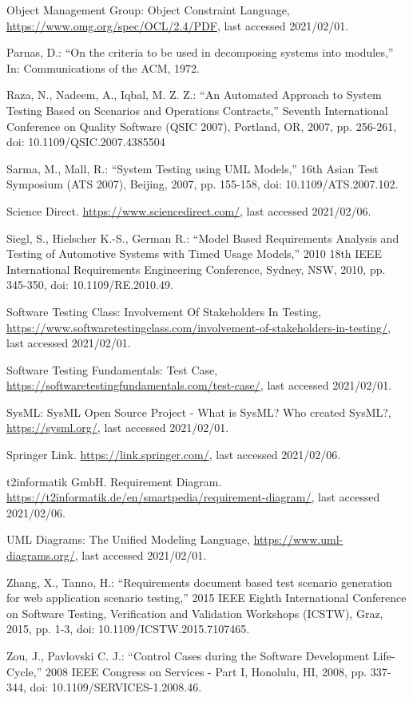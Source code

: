 \documentclass[a4paper,10pt, bibliography=totocnumbered]{scrreprt}
\begin{document}
\begin{thebibliography}{9}
 Object Management Group: Object Constraint Language, \url{https://www.omg.org/spec/OCL/2.4/PDF}, last accessed 2021/02/01.

 Parnas, D.: \enquote{On the criteria to be used in decomposing systems into modules,}
In: Communications of the ACM, 1972.

 Raza, N., Nadeem, A., Iqbal, M. Z. Z.: \enquote{An Automated Approach to System Testing Based on Scenarios and Operations Contracts,} Seventh International Conference on Quality Software (QSIC 2007), Portland, OR, 2007, pp. 256-261, doi: 10.1109/QSIC.2007.4385504

 Sarma, M., Mall, R.: \enquote{System Testing using UML Models,} 16th Asian Test Symposium (ATS 2007), Beijing, 2007, pp. 155-158, doi: 10.1109/ATS.2007.102.

 Science Direct. \url{https://www.sciencedirect.com/}, last accessed 2021/02/06.

 Siegl, S., Hielscher K.-S., German R.: \enquote{Model Based Requirements Analysis and Testing of Automotive Systems with Timed Usage Models,} 2010 18th IEEE International Requirements Engineering Conference, Sydney, NSW, 2010, pp. 345-350, doi: 10.1109/RE.2010.49.

 Software Testing Class: Involvement Of Stakeholders In Testing, \url{https://www.softwaretestingclass.com/involvement-of-stakeholders-in-testing/}, last accessed 2021/02/01.

 Software Testing Fundamentals: Test Case, \url{https://softwaretestingfundamentals.com/test-case/}, last accessed 2021/02/01.

 SysML: SysML Open Source Project - What is SysML? Who created SysML?, \url{https://sysml.org/}, last accessed 2021/02/01.

 Springer Link. \url{https://link.springer.com/}, last accessed 2021/02/06.

 t2informatik GmbH. Requirement Diagram.
\url{https://t2informatik.de/en/smartpedia/requirement-diagram/}, last accessed 2021/02/06. 

 UML Diagrams: The Unified Modeling Language, \url{https://www.uml-diagrams.org/}, last accessed 2021/02/01.

 Zhang, X., Tanno, H.: \enquote{Requirements document based test scenario generation for web application scenario testing,} 2015 IEEE Eighth International Conference on Software Testing, Verification and Validation Workshops (ICSTW), Graz, 2015, pp. 1-3, doi: 10.1109/ICSTW.2015.7107465.

 Zou, J., Pavlovski C. J.: \enquote{Control Cases during the Software Development Life-Cycle,} 2008 IEEE Congress on Services - Part I, Honolulu, HI, 2008, pp. 337-344, doi: 10.1109/SERVICES-1.2008.46.

\end{thebibliography}

\listoffigures

\listoftables
\end{document}
